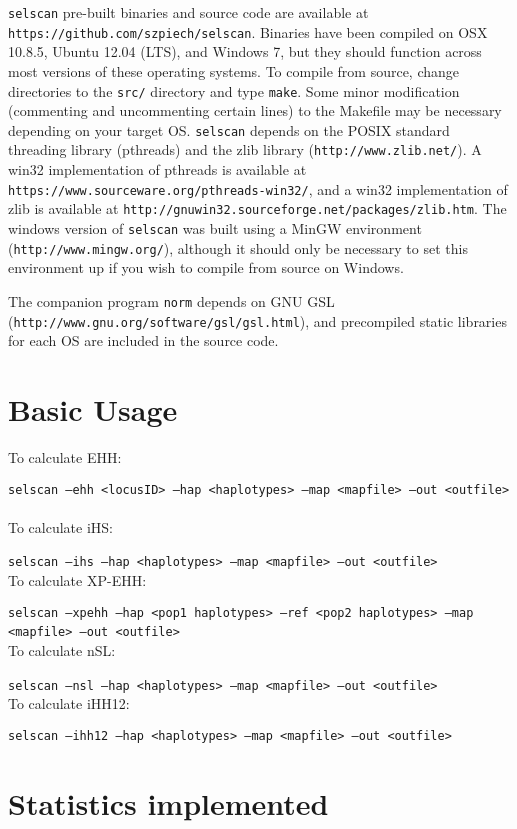 \documentclass[12pt]{article}%
\begin{document}
{\tt selscan} pre-built binaries and source code are available at {\tt https://github.com/szpiech/selscan}.  Binaries have been compiled on OSX 10.8.5, Ubuntu 12.04 (LTS), and Windows 7, but they should function across most versions of these operating systems.  To compile from source, change directories to the {\tt src/} directory and type {\tt make}.  Some minor modification (commenting and uncommenting certain lines) to the Makefile may be necessary depending on your target OS.  {\tt selscan} depends on the POSIX standard threading library (pthreads) and the zlib library ({\tt http://www.zlib.net/}). A win32 implementation of pthreads is available at {\tt https://www.sourceware.org/pthreads-win32/}, and a win32 implementation of zlib is available at {\tt http://gnuwin32.sourceforge.net/packages/zlib.htm}.  The windows version of {\tt selscan} was built using a MinGW environment ({\tt http://www.mingw.org/}), although it should only be necessary to set this environment up if you wish to compile from source on Windows.

The companion program {\tt norm} depends on GNU GSL ({\tt http://www.gnu.org/software/gsl/gsl.html}), and precompiled static libraries for each OS are included in the source code.

\section{Basic Usage}

To calculate EHH:

{\tt selscan --ehh <locusID> --hap <haplotypes> --map <mapfile> --out <outfile>}
~\\
\noindent To calculate iHS:

{\tt selscan --ihs --hap <haplotypes> --map <mapfile> --out <outfile>}
~\\
\noindent To calculate XP-EHH:

{\tt selscan --xpehh --hap <pop1 haplotypes> --ref <pop2 haplotypes> --map <mapfile> --out <outfile>}
~\\
\noindent To calculate nSL:

{\tt selscan --nsl --hap <haplotypes> --map <mapfile> --out <outfile>}
~\\
\noindent To calculate iHH12:

{\tt selscan --ihh12 --hap <haplotypes> --map <mapfile> --out <outfile>}


\section{Statistics implemented}
\end{document}
